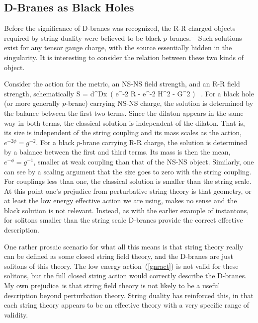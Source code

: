 \subsection{D-Branes as Black Holes}

Before the significance of D-branes was recognized, the R-R charged objects
required by string duality were believed to be black
$p$-branes.\cite{hullt}$^{\!-\,}$\cite{coni}
Such solutions exist for any tensor gauge charge,\cite{blackp} with the source
essentially hidden in the singularity.  It is interesting to consider the
relation between these two kinds of object.

Consider the action for the metric, an NS-NS field strength, and an R-R field
strength, schematically
\be
S = \int d^Dx\, \left( e^{-2\phi} R -  e^{-2\phi} H^2 -  G^2
\right) \ .  \label{gnract}
\ee
For a black hole (or more generally $p$-brane) carrying NS-NS charge, the
solution is determined by the balance between the first two terms.  Since the
dilaton appears in the same way in both terms, the classical solution is
independent of the dilaton.  That is, its size is independent of the string
coupling and its mass scales as the action,
$e^{-2\phi} = g^{-2}$. For a black $p$-brane carrying R-R charge, the solution
is determined by a balance between the first and third terms.  Its mass is
then the mean,
$e^{-\phi} = g^{-1}$, smaller at weak coupling than that of the NS-NS object. 
Similarly, one can see by a scaling argument that the size goes to zero with
the string coupling.  For couplings less than one, the classical solution is
smaller than the string scale.  At this point one's prejudice from
perturbative string theory is that geometry, or at least the low energy
effective action we are using, makes no sense and the black solution is not
relevant.
Instead, as with the earlier example of instantons, for solitons smaller than
the string scale D-branes provide the correct effective description.

One rather prosaic scenario for what all this means is that string theory
really can be defined as some closed string field theory, and the D-branes are
just solitons of this theory.  The low energy action~(\ref{gnract}) is not
valid for these solitons, but the full closed string action would correctly
describe the D-branes.  My own prejudice\,\cite{lesh} is that string field
theory is not likely to be a useful description beyond perturbation theory.
String duality has reinforced this, in that each string theory
appears to be an effective theory with a very specific range of validity.

